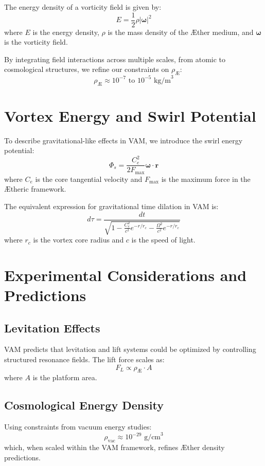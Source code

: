 \documentclass[a4paper,10pt]{article}
\begin{document}
        The energy density of a vorticity field is given by:
        \[ E = \frac{1}{2} \rho |\mathbf{\omega}|^2 \]
        where $E$ is the energy density, $\rho$ is the mass density of the \AE{}ther medium, and $\mathbf{\omega}$ is the vorticity field.

        By integrating field interactions across multiple scales, from atomic to cosmological structures, we refine our constraints on $\rho_\text{\AE}$:
        \[ \rho_\text{\AE} \approx 10^{-7} \text{ to } 10^{-5} \text{ kg/m}^3 \]


        \section{Vortex Energy and Swirl Potential}\label{sec:vortex-energy-and-swirl-potential}

        To describe gravitational-like effects in VAM, we introduce the swirl energy potential:
        \[ \Phi_s = \frac{C_e^2}{2F_{\text{max}}} \mathbf{\omega} \cdot \mathbf{r} \]
        where $C_e$ is the core tangential velocity and $F_{\text{max}}$ is the maximum force in the \AE{}theric framework.

        The equivalent expression for gravitational time dilation in VAM is:
        \[ d\tau = \frac{dt}{\sqrt{1 - \frac{C_e^2}{c^2} e^{-r/r_c} - \frac{\Omega^2}{c^2} e^{-r/r_c}}} \]
        where $r_c$ is the vortex core radius and $c$ is the speed of light.


        \section{Experimental Considerations and Predictions}\label{sec:experimental-considerations-and-predictions}

        \subsection{Levitation Effects}\label{subsec:levitation-effects}
        VAM predicts that levitation and lift systems could be optimized by controlling structured resonance fields. The lift force scales as:
        \[ F_L \propto \rho_\text{\AE} \cdot A \]
        where $A$ is the platform area.

        \subsection{Cosmological Energy Density}\label{subsec:cosmological-energy-density}
        Using constraints from vacuum energy studies:
        \[ \rho_\text{vac} \approx 10^{-29} \text{ g/cm}^3 \]
        which, when scaled within the VAM framework, refines \AE{}ther density predictions.
\end{document}
